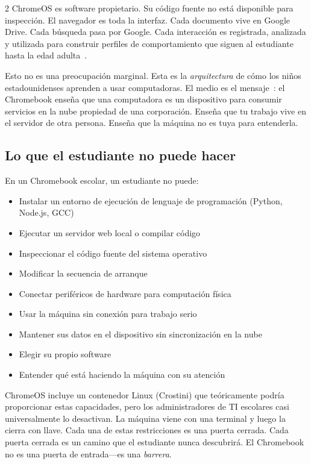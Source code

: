 \documentclass[11pt, a4paper]{article}
\begin{document}
\begin{multicols}{2}
ChromeOS es software propietario. Su código fuente no está disponible para inspección. El navegador es toda la interfaz. Cada documento vive en Google Drive. Cada búsqueda pasa por Google. Cada interacción es registrada, analizada y utilizada para construir perfiles de comportamiento que siguen al estudiante hasta la edad adulta~\citep{zuboff2019surveillance}.

Esto no es una preocupación marginal. Esta es la \emph{arquitectura} de cómo los niños estadounidenses aprenden a usar computadoras. El medio es el mensaje~\citep{mcluhan1964understanding}: el Chromebook enseña que una computadora es un dispositivo para consumir servicios en la nube propiedad de una corporación. Enseña que tu trabajo vive en el servidor de otra persona. Enseña que la máquina no es tuya para entenderla.

\subsection{Lo que el estudiante no puede hacer}

En un Chromebook escolar, un estudiante no puede:

\begin{itemize}
  \item Instalar un entorno de ejecución de lenguaje de programación (Python, Node.js, GCC)
  \item Ejecutar un servidor web local o compilar código
  \item Inspeccionar el código fuente del sistema operativo
  \item Modificar la secuencia de arranque
  \item Conectar periféricos de hardware para computación física
  \item Usar la máquina sin conexión para trabajo serio
  \item Mantener sus datos en el dispositivo sin sincronización en la nube
  \item Elegir su propio software
  \item Entender qué está haciendo la máquina con su atención
\end{itemize}

ChromeOS incluye un contenedor Linux (Crostini) que teóricamente podría proporcionar estas capacidades, pero los administradores de TI escolares casi universalmente lo desactivan. La máquina viene con una terminal y luego la cierra con llave. Cada una de estas restricciones es una puerta cerrada. Cada puerta cerrada es un camino que el estudiante nunca descubrirá. El Chromebook no es una puerta de entrada---es una \emph{barrera}.


\end{multicols}
\end{document}
